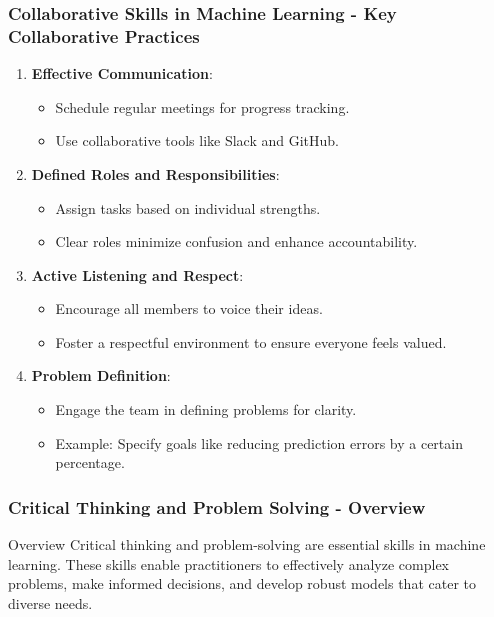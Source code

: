 \documentclass[aspectratio=169]{beamer}
\begin{document}
\begin{frame}[fragile]
    \frametitle{Collaborative Skills in Machine Learning - Key Collaborative Practices}
    
    \begin{enumerate}
        \item \textbf{Effective Communication}:
            \begin{itemize}
                \item Schedule regular meetings for progress tracking.
                \item Use collaborative tools like Slack and GitHub.
            \end{itemize}
        
        \item \textbf{Defined Roles and Responsibilities}:
            \begin{itemize}
                \item Assign tasks based on individual strengths.
                \item Clear roles minimize confusion and enhance accountability.
            \end{itemize}
        
        \item \textbf{Active Listening and Respect}:
            \begin{itemize}
                \item Encourage all members to voice their ideas.
                \item Foster a respectful environment to ensure everyone feels valued.
            \end{itemize}
        
        \item \textbf{Problem Definition}:
            \begin{itemize}
                \item Engage the team in defining problems for clarity.
                \item Example: Specify goals like reducing prediction errors by a certain percentage.
            \end{itemize}
    \end{enumerate}
\end{frame}

\begin{frame}[fragile]
    \frametitle{Critical Thinking and Problem Solving - Overview}
    \begin{block}{Overview}
        Critical thinking and problem-solving are essential skills in machine learning. 
        These skills enable practitioners to effectively analyze complex problems, make informed decisions, 
        and develop robust models that cater to diverse needs.
    \end{block}
\end{frame}
\end{document}

